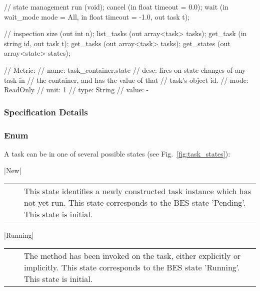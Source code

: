 \begin{myspec}
{{      // state management
      run               (void);
      cancel            (in  float           timeout =  0.0);
      wait              (in  wait_mode       mode    =  All,
                         in  float           timeout = -1.0,
                         out task            t);
 
      // inspection
      size              (out int             n);
      list_tasks        (out array<task>     tasks);
      get_task          (in  string          id, 
                         out task            t);
      get_tasks         (out array<task>     tasks);
      get_states        (out array<state>    states);
 
      // Metric:
      //   name:  task_container.state
      //   desc:  fires on state changes of any task in
      //          the container, and has the value of that
      //          task's object id.
      //   mode:  ReadOnly
      //   unit:  1
      //   type:  String
      //   value: -
    }
  }
 \end{myspec}
 
 
 \subsubsection{Specification Details}
 
 
  \subsubsection*{Enum }
 
  A task can be in one of several possible states (see
  Fig.~\ref{fig:task_states}):
  
 
    |New|\\[1.5mm]
    \begin{tabular}{cp{110mm}}
      ~~ & This state identifies a newly constructed task
           instance which has not yet run.  This state corresponds to
           the BES state 'Pending'.   This state is initial.
    \end{tabular}
 
    |Running|\\[1.5mm]
    \begin{tabular}{cp{110mm}}
       ~~ & The \T{run()} method has been invoked on the task, either
            explicitly or implicitly.  This state corresponds to the
            BES state 'Running'.  This state is initial.  
    \end{tabular}
 
